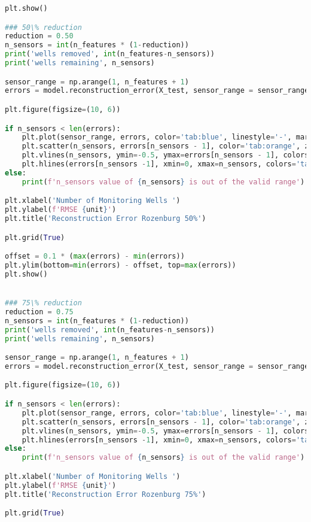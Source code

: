\begin{lstlisting}[language=Python]
plt.show()

### 50\% reduction
reduction = 0.50
n_sensors = int(n_features * (1-reduction))
print('wells removed', int(n_features-n_sensors))
print('wells remaining', n_sensors)

sensor_range = np.arange(1, n_features + 1)
errors = model.reconstruction_error(X_test, sensor_range = sensor_range)

plt.figure(figsize=(10, 6))

if n_sensors < len(errors): 
    plt.plot(sensor_range, errors, color='tab:blue', linestyle='-', marker='')
    plt.scatter(n_sensors, errors[n_sensors - 1], color='tab:orange', zorder=5)
    plt.vlines(n_sensors, ymin=-0.5, ymax=errors[n_sensors - 1], colors='tab:orange', linestyle='--', linewidth=2.0, label='Selected number of wells')
    plt.hlines(errors[n_sensors -1], xmin=0, xmax=n_sensors, colors='tab:orange', linestyle='--', linewidth=2.0)
else: 
    print(f'n_sensors value of {n_sensors} is out of the valid range')

plt.xlabel('Number of Monitoring Wells ')
plt.ylabel(f'RMSE {unit}')
plt.title('Reconstruction Error Rozenburg 50%')

plt.grid(True)

offset = 0.1 * (max(errors) - min(errors))
plt.ylim(bottom=min(errors) - offset, top=max(errors))
plt.show()


### 75\% reduction
reduction = 0.75
n_sensors = int(n_features * (1-reduction))
print('wells removed', int(n_features-n_sensors))
print('wells remaining', n_sensors)

sensor_range = np.arange(1, n_features + 1)
errors = model.reconstruction_error(X_test, sensor_range = sensor_range)

plt.figure(figsize=(10, 6))

if n_sensors < len(errors): 
    plt.plot(sensor_range, errors, color='tab:blue', linestyle='-', marker='')
    plt.scatter(n_sensors, errors[n_sensors - 1], color='tab:orange', zorder=5)
    plt.vlines(n_sensors, ymin=-0.5, ymax=errors[n_sensors - 1], colors='tab:orange', linestyle='--', linewidth=2.0, label='Selected number of wells')
    plt.hlines(errors[n_sensors -1], xmin=0, xmax=n_sensors, colors='tab:orange', linestyle='--', linewidth=2.0)
else: 
    print(f'n_sensors value of {n_sensors} is out of the valid range')

plt.xlabel('Number of Monitoring Wells ')
plt.ylabel(f'RMSE {unit}')
plt.title('Reconstruction Error Rozenburg 75%')

plt.grid(True)


\end{lstlisting}
